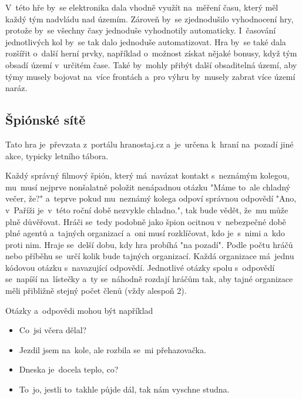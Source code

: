 V~této hře by~se elektronika dala vhodně využít na~měření času, který měl každý tým nadvládu nad územím.
Zároveň by~se zjednodušilo vyhodnocení hry, protože by~se všechny časy jednoduše vyhodnotily automaticky.
I~časování jednotlivých kol by~se tak dalo jednoduše automatizovat.
Hra by~se také dala rozšířit o~další herní prvky, například o~možnost získat nějaké bonusy, když tým obsadí území v~určitém čase.
Také by~mohly přibýt další obsaditelná území, aby týmy musely bojovat na~více frontách a~pro výhru by~musely zabrat více území naráz.

\vspace{-2mm}
\subsection{Špiónské sítě \label{SpionskeSite}}
Tato hra je~převzata z~portálu hranostaj.cz \cite{SpionskeSite} a~je~určena k~hraní na~pozadí jiné akce, typicky letního tábora.

Každý správný filmový špión, který má~navázat kontakt s~neznámým kolegou, mu~musí nejprve nonšalatně položit nenápadnou otázku "Máme to~ale chladný večer, že?" a~teprve pokud mu~neznámý kolega odpoví správnou odpovědí "Ano, v~Paříži je~v~této roční době nezvykle chladno.", tak bude vědět, že~mu může plně důvěřovat.
Hráči se~tedy podobně jako špion ocitnou v~nebezpečné době plné agentů a~tajných organizací a~oni musí rozklíčovat, kdo je~s~nimi a~kdo proti nim.
Hraje se~delší dobu, kdy hra probíhá "na pozadí". 
Podle počtu hráčů nebo příběhu se~určí kolik bude tajných organizací. 
Každá organizace má~jednu kódovou otázku s~navazující odpovědí. 
Jednotlivé otázky spolu s~odpovědí se~napíší na~lístečky a~ty se~náhodně rozdají hráčům tak, aby tajné organizace měli přibližně stejný počet členů (vždy alespoň 2).

Otázky a~odpovědi mohou být například
\vspace{5mm}
\begin{itemize}
    \item Co~jsi včera dělal?
    \item Jezdil jsem na~kole, ale rozbila se~mi přehazovačka.
\end{itemize}
\vspace{5mm}

\begin{itemize}
    \item Dneska je~docela teplo, co?
    \item To~jo, jestli to~takhle půjde dál, tak nám vyschne studna.
\end{itemize}
\vspace{5mm}


